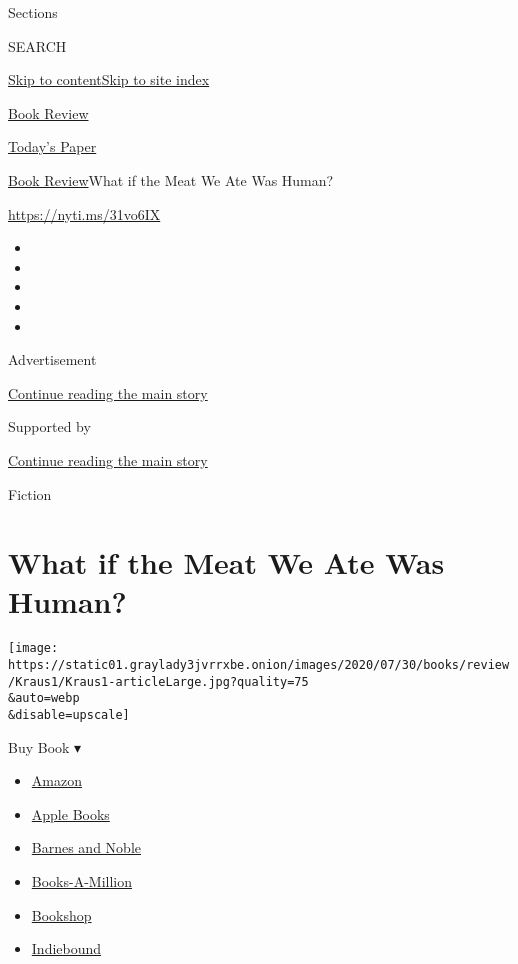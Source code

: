 Sections

SEARCH

\protect\hyperlink{site-content}{Skip to
content}\protect\hyperlink{site-index}{Skip to site index}

\href{https://www.nytimes3xbfgragh.onion/section/books/review}{Book
Review}

\href{https://myaccount.nytimes3xbfgragh.onion/auth/login?response_type=cookie\&client_id=vi}{}

\href{https://www.nytimes3xbfgragh.onion/section/todayspaper}{Today's
Paper}

\href{/section/books/review}{Book Review}\textbar{}What if the Meat We
Ate Was Human?

\url{https://nyti.ms/31vo6IX}

\begin{itemize}
\item
\item
\item
\item
\item
\end{itemize}

Advertisement

\protect\hyperlink{after-top}{Continue reading the main story}

Supported by

\protect\hyperlink{after-sponsor}{Continue reading the main story}

Fiction

\hypertarget{what-if-the-meat-we-ate-was-human}{%
\section{What if the Meat We Ate Was
Human?}\label{what-if-the-meat-we-ate-was-human}}

\texttt{[image: https://static01.graylady3jvrrxbe.onion/images/2020/07/30/books/review/Kraus1/Kraus1-articleLarge.jpg?quality=75\\\&auto=webp\\\&disable=upscale]}

Buy Book ▾

\begin{itemize}
\tightlist
\item
  \href{https://www.amazon.com/gp/search?index=books\&tag=NYTBSREV-20\&field-keywords=Tender+Is+the+Flesh+Agustina+Bazterrica}{Amazon}
\item
  \href{https://du-gae-books-dot-nyt-du-prd.appspot.com/buy?title=Tender+Is+the+Flesh\&author=Agustina+Bazterrica}{Apple
  Books}
\item
  \href{https://www.anrdoezrs.net/click-7990613-11819508?url=https\%3A\%2F\%2Fwww.barnesandnoble.com\%2Fw\%2F\%3Fean\%3D9781982150921}{Barnes
  and Noble}
\item
  \href{https://www.anrdoezrs.net/click-7990613-35140?url=https\%3A\%2F\%2Fwww.booksamillion.com\%2Fp\%2FTender\%2BIs\%2Bthe\%2BFlesh\%2FAgustina\%2BBazterrica\%2F9781982150921}{Books-A-Million}
\item
  \href{https://bookshop.org/a/3546/9781982150921}{Bookshop}
\item
  \href{https://www.indiebound.org/book/9781982150921?aff=NYT}{Indiebound}
\end{itemize}


